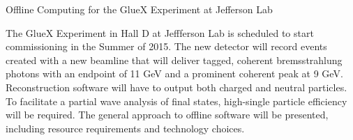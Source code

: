 Offline Computing for the GlueX Experiment at Jefferson Lab

The GlueX Experiment in Hall D at Jeffferson Lab is scheduled to start
commissioning in the Summer of 2015. The new detector will record
events created with a new beamline that will deliver tagged, coherent
bremsstrahlung photons with an endpoint of 11 GeV and a prominent
coherent peak at 9 GeV. Reconstruction software will have to output
both charged and neutral particles. To facilitate a partial wave
analysis of final states, high-single particle efficiency will be
required. The general approach to offline software will
be presented, including resource requirements and technology choices.
